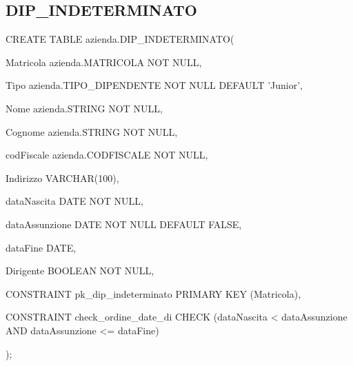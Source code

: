         \subsection{DIP\_INDETERMINATO}
            \ttfamily
                \begin{flushleft}
                    \begin{description}
                        \item CREATE TABLE azienda.DIP\_INDETERMINATO(                
                        \begin{description}
                            \item Matricola azienda.MATRICOLA NOT NULL,
                            \item Tipo azienda.TIPO\_DIPENDENTE NOT NULL DEFAULT 'Junior',
                            \item Nome azienda.STRING NOT NULL,
                            \item Cognome azienda.STRING NOT NULL,
                            \item codFiscale azienda.CODFISCALE NOT NULL,
                            \item Indirizzo VARCHAR(100),
                            \item dataNascita DATE NOT NULL,
                            \item dataAssunzione DATE NOT NULL DEFAULT FALSE,
                            \item dataFine DATE,
                            \item Dirigente BOOLEAN NOT NULL,
                            
                            \vspace{0.5cm}

                            \item CONSTRAINT pk\_dip\_indeterminato PRIMARY KEY (Matricola),
                            \item CONSTRAINT check\_ordine\_date\_di CHECK (dataNascita < dataAssunzione AND dataAssunzione <= dataFine)
                        \end{description}
                        );
                    \end{description}
                \end{flushleft}
            \normalfont

